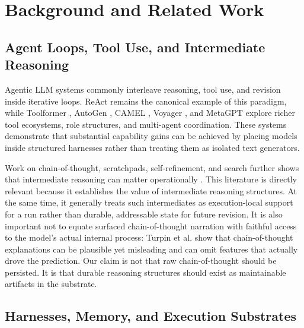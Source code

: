 \documentclass{article}
\begin{document}
\section{Background and Related Work}

\subsection{Agent Loops, Tool Use, and Intermediate Reasoning}

Agentic LLM systems commonly interleave reasoning, tool use, and revision inside iterative loops. ReAct \cite{yao2023react} remains the canonical example of this paradigm, while Toolformer \cite{schick2023toolformer}, AutoGen \cite{wu2023autogen}, CAMEL \cite{li2023camel}, Voyager \cite{wang2023voyager}, and MetaGPT \cite{hong2023metagpt} explore richer tool ecosystems, role structures, and multi-agent coordination. These systems demonstrate that substantial capability gains can be achieved by placing models inside structured harnesses rather than treating them as isolated text generators.

Work on chain-of-thought, scratchpads, self-refinement, and search further shows that intermediate reasoning can matter operationally \cite{nye2021scratchpads,wei2022cot,wang2022selfconsistency,zhou2022leasttomost,yao2023tree,shinn2023reflexion,madaan2023selfrefine,zhou2023lats}. This literature is directly relevant because it establishes the value of intermediate reasoning structures. At the same time, it generally treats such intermediates as execution-local support for a run rather than durable, addressable state for future revision. It is also important not to equate surfaced chain-of-thought narration with faithful access to the model's actual internal process: Turpin et al. \cite{turpin2023unfaithful} show that chain-of-thought explanations can be plausible yet misleading and can omit features that actually drove the prediction. Our claim is not that raw chain-of-thought should be persisted. It is that durable reasoning structures should exist as maintainable artifacts in the substrate.

\subsection{Harnesses, Memory, and Execution Substrates}
\end{document}
